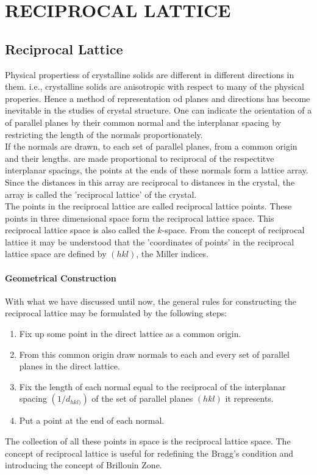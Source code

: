 \chapter{RECIPROCAL LATTICE}

\section{Reciprocal Lattice}
Physical propertiess of crystalline solids are different in different directions in them. i.e., crystalline solids are anisotropic with respect to many of the physical properies. Hence a method of representation od planes and directions has become inevitable in the studies of crystal structure.
One can indicate the orientation of a of parallel planes by their common normal and the interplanar spacing by restricting the length of the normals proportionately.\\
If the normals are drawn, to each set of parallel planes, from a common origin and their lengths. are made proportional to reciprocal of the respectitve interplanar spacings, the points at the ends of these normals form a lattice array. Since the distances in this array are reciprocal to distances in the crystal, the array is called the 'reciprocal lattice' of the crystal.\\
The points in the reciprocal lattice are called reciprocal lattice points. These points in three dimensional space form the reciprocal lattice space. This reciprocal lattice space is also called the $k$-space. From the concept of reciprocal lattice it may be understood that the 'coordinates of points' in the reciprocal lattice space are defined by $(h k l)$, the Miller indices.\\
\subsubsection{Geometrical Construction}
With what we have discussed until now, the general rules for constructing the reciprocal lattice may be formulated by the following steps:
\begin{enumerate}
	\item Fix up some point in the direct lattice as a common origin.
	\item From this common origin draw normals to each and every set of parallel planes in the direct lattice.
	\item Fix the length of each normal equal to the reciprocal of the interplanar spacing $\left(1 / d_{hk l)}\right)$ of the set of parallel planes $(h k l)$ it represents.
	\item Put a point at the end of each normal.
\end{enumerate}
The collection of all these points in space is the reciprocal lattice space. The concept of reciprocal lattice is useful for redefining the Bragg's condition and introducing the concept of Brillouin Zone.

